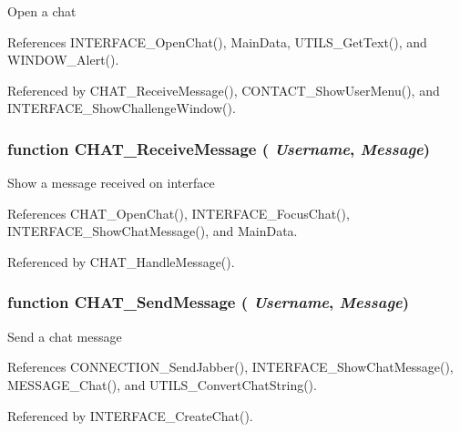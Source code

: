 Open a chat 

References INTERFACE\_\-OpenChat(), MainData, UTILS\_\-GetText(), and WINDOW\_\-Alert().

Referenced by CHAT\_\-ReceiveMessage(), CONTACT\_\-ShowUserMenu(), and INTERFACE\_\-ShowChallengeWindow().
\subsubsection{\setlength{\rightskip}{0pt plus 5cm}function CHAT\_\-ReceiveMessage ( {\em Username}, \/   {\em Message})}\label{chat_2chat_8js_7f659442a1884818e52eb2d1a23022dd}


Show a message received on interface 

References CHAT\_\-OpenChat(), INTERFACE\_\-FocusChat(), INTERFACE\_\-ShowChatMessage(), and MainData.

Referenced by CHAT\_\-HandleMessage().
\subsubsection{\setlength{\rightskip}{0pt plus 5cm}function CHAT\_\-SendMessage ( {\em Username}, \/   {\em Message})}\label{chat_2chat_8js_ca2bf1915cb3b4cd64d41f6e8f229982}


Send a chat message 

References CONNECTION\_\-SendJabber(), INTERFACE\_\-ShowChatMessage(), MESSAGE\_\-Chat(), and UTILS\_\-ConvertChatString().

Referenced by INTERFACE\_\-CreateChat().
